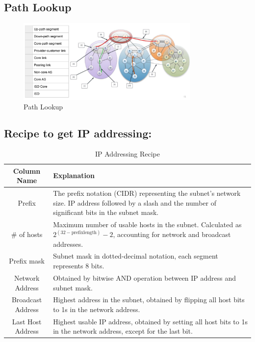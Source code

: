 \documentclass{article}
\begin{document}
\subsection{Path Lookup}
\begin{figure}[h]
    \centering
    \includegraphics[width=0.8\textwidth]{assets/internet.png}
    \caption{Path Lookup}
\end{figure}

\subsection{Recipe to get IP addressing:}
\begin{table}[h]
    \centering
    \begin{tabular}{|c|p{10cm}|}
        \hline
        \textbf{Column Name} & \textbf{Explanation} \\
        \hline
        Prefix & The prefix notation (CIDR) representing the subnet's network size. IP address followed by a slash and the number of significant bits in the subnet mask. \\
        \hline
        \# of hosts & Maximum number of usable hosts in the subnet. Calculated as $2^{(32 - \mathrm{prefix length})} - 2$, accounting for network and broadcast addresses. \\
        \hline
        Prefix mask & Subnet mask in dotted-decimal notation, each segment represents 8 bits. \\
        \hline
        Network Address & Obtained by bitwise AND operation between IP address and subnet mask. \\
        \hline
        Broadcast Address & Highest address in the subnet, obtained by flipping all host bits to 1s in the network address. \\
        \hline
        Last Host Address & Highest usable IP address, obtained by setting all host bits to 1s in the network address, except for the last bit. \\
        \hline
    \end{tabular}
    \caption{IP Addressing Recipe}
\end{table}
\end{document}
